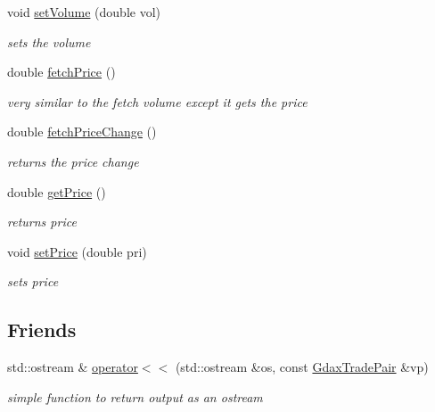 \begin{DoxyCompactItemize}
void \mbox{\hyperlink{class_gdax_trade_pair_ac9fb00c66634690b9fbb5f2f4a457820}{set\+Volume}} (double vol)
\begin{DoxyCompactList}\small\item\em sets the volume \end{DoxyCompactList}\item 
double \mbox{\hyperlink{class_gdax_trade_pair_adacd391af9a85002ae707c374a1ad17c}{fetch\+Price}} ()
\begin{DoxyCompactList}\small\item\em very similar to the fetch volume except it gets the price \end{DoxyCompactList}\item 
double \mbox{\hyperlink{class_gdax_trade_pair_af6c2de9262607777c2fc22d25b700fc6}{fetch\+Price\+Change}} ()
\begin{DoxyCompactList}\small\item\em returns the price change \end{DoxyCompactList}\item 
double \mbox{\hyperlink{class_gdax_trade_pair_aaec623f9a4d7cb24ee924aa999bfc94a}{get\+Price}} ()
\begin{DoxyCompactList}\small\item\em returns price \end{DoxyCompactList}\item 
void \mbox{\hyperlink{class_gdax_trade_pair_ad4e2b464d846c9800ea5f53f6cbdf4ba}{set\+Price}} (double pri)
\begin{DoxyCompactList}\small\item\em sets price \end{DoxyCompactList}\end{DoxyCompactItemize}
\subsection*{Friends}
\begin{DoxyCompactItemize}
\item 
\mbox{\label{class_gdax_trade_pair_a9cd15a913e928287eb77e4cb52c8b6cc}} 
std\+::ostream \& \mbox{\hyperlink{class_gdax_trade_pair_a9cd15a913e928287eb77e4cb52c8b6cc}{operator$<$$<$}} (std\+::ostream \&os, const \mbox{\hyperlink{class_gdax_trade_pair}{Gdax\+Trade\+Pair}} \&vp)
\begin{DoxyCompactList}\small\item\em simple function to return output as an ostream \end{DoxyCompactList}\end{DoxyCompactItemize}


